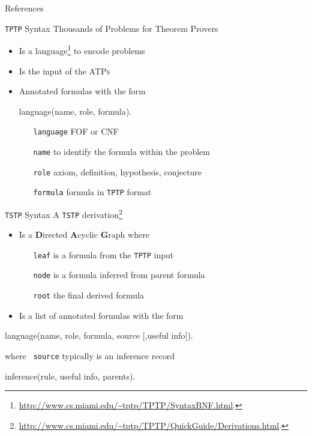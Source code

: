 \documentclass[10pt, xetex, hyperref={pdfpagelabels=false}]{beamer}
\newcommand{\abbre}[1]{\textsc{#1}\xspace}
\newcommand{\ATPs}{\abbre{ATPs}}
\newcommand{\len}[1]{\texttt{#1}\xspace}
\newcommand{\TPTP}{\len{TPTP}}
\newcommand{\TSTP}{\len{TSTP}}
\begin{document}
\begin{frame}[allowframebreaks]{References}
\printbibliography
\end{frame}


\begin{frame}
\end{frame}

\begin{frame}[fragile, label=tptp-syntax]{\TPTP Syntax}
  {Thousands of Problems for Theorem Provers}

  \begin{itemize}
  \item Is a language\footnote{\url{http://www.cs.miami.edu/~tptp/TPTP/SyntaxBNF.html}.}  to encode problems
  \item Is the input of the \ATPs
  \item Annotated formulas with the form
   \begin{center}
\begin{tptp}
language(name, role, formula).
\end{tptp}
    \end{center}
    \begin{itemize}
      \item[\texttt{language}] FOF or CNF
      \item[\texttt{name}] to identify the formula within the problem
      \item[\texttt{role}] axiom, definition, hypothesis, conjecture
      \item[\texttt{formula}] formula in \TPTP format
    \end{itemize}
  \end{itemize}
\end{frame}

\begin{frame}[fragile]{\TSTP Syntax}
A \TSTP derivation\footnote{\url{http://www.cs.miami.edu/~tptp/TPTP/QuickGuide/Derivations.html}.}
\begin{itemize}
  \item Is a \textbf{D}irected \textbf{A}cyclic \textbf{G}raph where
  \begin{itemize}
    \item[\texttt{leaf}] is a formula from the \TPTP input
    \item[\texttt{node}] is a formula inferred from parent formula
    \item[\texttt{root}] the final derived formula
  \end{itemize}
  \item Is a list of annotated formulas with the form
  \end{itemize}

\begin{tptp}
  language(name, role, formula, source [,useful info]).
\end{tptp}

where \texttt{\color{blu} source} typically is an inference record
\begin{tptp}
  inference(rule, useful info, parents).
\end{tptp}
\end{frame}
\end{document}
